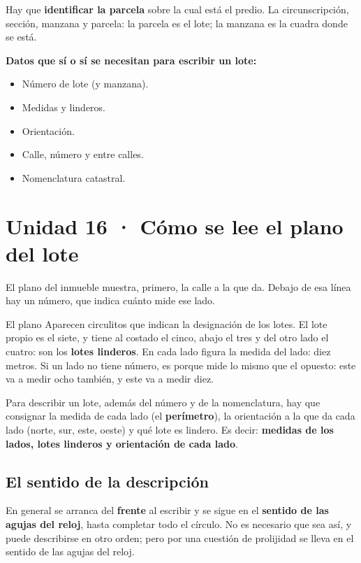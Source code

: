 \documentclass[12pt,oneside]{book}
\begin{document}
Hay que \textbf{identificar la parcela} sobre la cual está el predio. La circunscripción, sección, manzana y parcela: la parcela es el lote; la manzana es la cuadra donde se está.

\begin{important}
\textbf{Datos que sí o sí se necesitan para escribir un lote:}
\begin{itemize}
    \item Número de lote (y manzana).
    \item Medidas y linderos.
    \item Orientación.
    \item Calle, número y entre calles.
    \item Nomenclatura catastral.
\end{itemize}
\end{important}

\section{Unidad 16 · Cómo se lee el plano del lote}

El plano del inmueble muestra, primero, la calle a la que da. Debajo de esa línea hay un número, que indica cuánto mide ese lado.

\begin{example}{El plano}
Aparecen circulitos que indican la designación de los lotes. El lote propio es el siete, y tiene al costado el cinco, abajo el tres y del otro lado el cuatro: son los \textbf{lotes linderos}. En cada lado figura la medida del lado: diez metros. Si un lado no tiene número, es porque mide lo mismo que el opuesto: este va a medir ocho también, y este va a medir diez.
\end{example}

Para describir un lote, además del número y de la nomenclatura, hay que consignar la medida de cada lado (el \textbf{perímetro}), la orientación a la que da cada lado (norte, sur, este, oeste) y qué lote es lindero. Es decir: \textbf{medidas de los lados, lotes linderos y orientación de cada lado}.

\subsection{El sentido de la descripción}

En general se arranca del \textbf{frente} al escribir y se sigue en el \textbf{sentido de las agujas del reloj}, hasta completar todo el círculo. No es necesario que sea así, y puede describirse en otro orden; pero por una cuestión de prolijidad se lleva en el sentido de las agujas del reloj.
\end{document}

